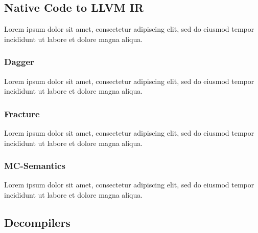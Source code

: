 \documentclass[12pt, a4paper]{article}
\begin{document}

\subsection{Native Code to LLVM IR}


Lorem ipsum dolor sit amet, consectetur adipiscing elit, sed do eiusmod tempor incididunt ut labore et dolore magna aliqua.


\subsubsection{Dagger}

Lorem ipsum dolor sit amet, consectetur adipiscing elit, sed do eiusmod tempor incididunt ut labore et dolore magna aliqua.


\subsubsection{Fracture}

Lorem ipsum dolor sit amet, consectetur adipiscing elit, sed do eiusmod tempor incididunt ut labore et dolore magna aliqua.


\subsubsection{MC-Semantics}


Lorem ipsum dolor sit amet, consectetur adipiscing elit, sed do eiusmod tempor incididunt ut labore et dolore magna aliqua.


\subsection{Decompilers}
\end{document}

